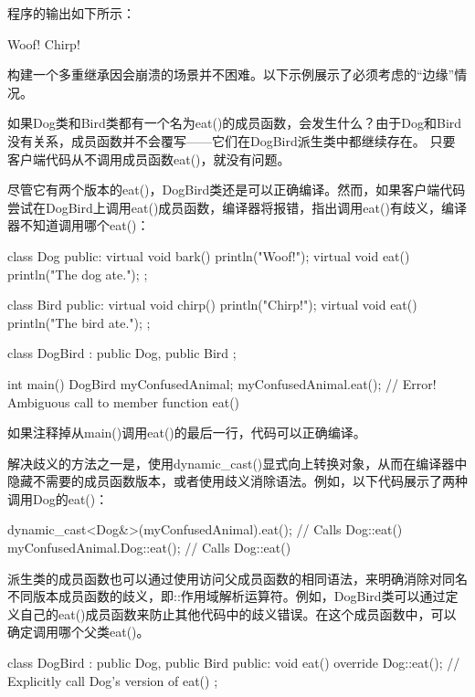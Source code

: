 程序的输出如下所示：

\begin{shell}
Woof!
Chirp!
\end{shell}


构建一个多重继承因会崩溃的场景并不困难。以下示例展示了必须考虑的“边缘”情况。


如果Dog类和Bird类都有一个名为eat()的成员函数，会发生什么？由于Dog和Bird没有关系，成员函数并不会覆写——它们在DogBird派生类中都继续存在。 只要客户端代码从不调用成员函数eat()，就没有问题。

尽管它有两个版本的eat()，DogBird类还是可以正确编译。然而，如果客户端代码尝试在DogBird上调用eat()成员函数，编译器将报错，指出调用eat()有歧义，编译器不知道调用哪个eat()：

\begin{cpp}
class Dog
{
    public:
        virtual void bark() { println("Woof!"); }
        virtual void eat() { println("The dog ate."); }
};

class Bird
{
    public:
        virtual void chirp() { println("Chirp!"); }
        virtual void eat() { println("The bird ate."); }
};

class DogBird : public Dog, public Bird
{
};

int main()
{
    DogBird myConfusedAnimal;
    myConfusedAnimal.eat(); // Error! Ambiguous call to member function eat()
}
\end{cpp}

如果注释掉从main()调用eat()的最后一行，代码可以正确编译。

解决歧义的方法之一是，使用dynamic\_cast()显式向上转换对象，从而在编译器中隐藏不需要的成员函数版本，或者使用歧义消除语法。例如，以下代码展示了两种调用Dog的eat()：

\begin{cpp}
dynamic_cast<Dog&>(myConfusedAnimal).eat(); // Calls Dog::eat()
myConfusedAnimal.Dog::eat(); // Calls Dog::eat()
\end{cpp}

派生类的成员函数也可以通过使用访问父成员函数的相同语法，来明确消除对同名不同版本成员函数的歧义，即::作用域解析运算符。例如，DogBird类可以通过定义自己的eat()成员函数来防止其他代码中的歧义错误。在这个成员函数中，可以确定调用哪个父类eat()。

\begin{cpp}
class DogBird : public Dog, public Bird
{
    public:
        void eat() override
        {
            Dog::eat(); // Explicitly call Dog's version of eat()
        }
};
\end{cpp}

